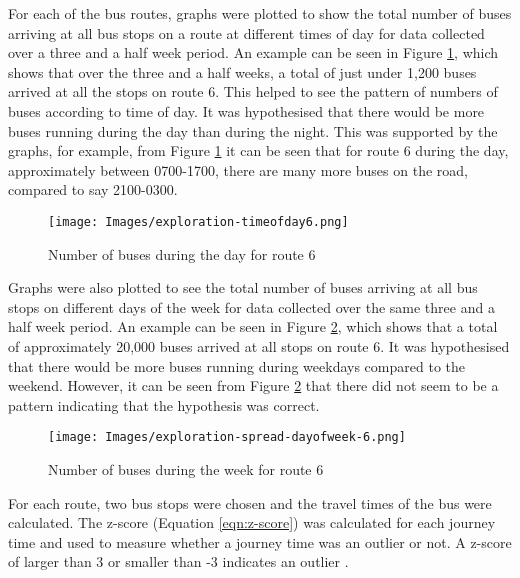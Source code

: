 For each of the bus routes, graphs were plotted to show the total number of buses arriving at all bus stops on a route at different times of day for data collected over a three and a half week period. An example can be seen in Figure \ref{fig:spread-of-buses-over-day-6}, which shows that over the three and a half weeks, a total of just under 1,200 buses arrived at all the stops on route 6. This helped to see the pattern of numbers of buses according to time of day. It was hypothesised that there would be more buses running during the day than during the night. This was supported by the graphs, for example, from Figure \ref{fig:spread-of-buses-over-day-6} it can be seen that for route 6 during the day, approximately between 0700-1700, there are many more buses on the road, compared to say 2100-0300. 

\begin{figure}[H]
\begin{center}
    \texttt{[image: Images/exploration-timeofday6.png]}
    \caption{Number of buses during the day for route 6}
    \label{fig:spread-of-buses-over-day-6}
\end{center}
\end{figure}

Graphs were also plotted to see the total number of buses arriving at all bus stops on different days of the week for data collected over the same three and a half week period. An example can be seen in Figure \ref{fig:spread-of-buses-over-week-6}, which shows that a total of approximately 20,000 buses arrived at all stops on route 6. It was hypothesised that there would be more buses running during weekdays compared to the weekend. However, it can be seen from Figure \ref{fig:spread-of-buses-over-week-6} that there did not seem to be a pattern indicating that the hypothesis was correct.

\begin{figure}[H]
\begin{center}
    \texttt{[image: Images/exploration-spread-dayofweek-6.png]}
    \caption{Number of buses during the week for route 6}
    \label{fig:spread-of-buses-over-week-6}
\end{center}
\end{figure}

For each route, two bus stops were chosen and the travel times of the bus were calculated. The z-score (Equation \ref{eqn:z-score}) was calculated for each journey time and used to measure whether a journey time was an outlier or not. A z-score of larger than 3 or smaller than -3 indicates an outlier \cite{significance-of-eda}. 

